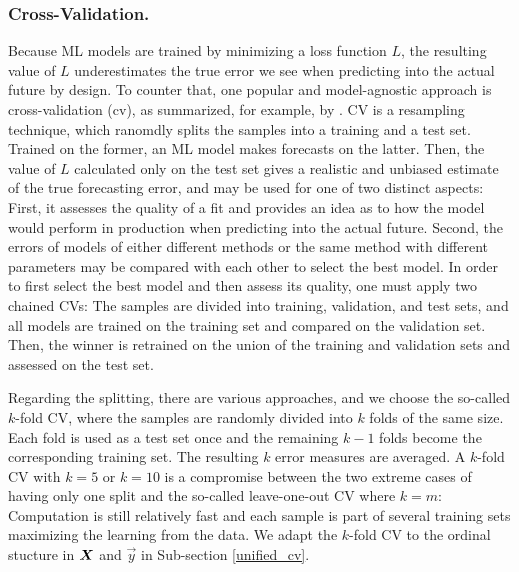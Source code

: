 \subsubsection{Cross-Validation.}
\label{cv}

Because ML models are trained by minimizing a loss function $L$, the
    resulting value of $L$ underestimates the true error we see when
    predicting into the actual future by design.
To counter that, one popular and model-agnostic approach is cross-validation
    (\gls{cv}), as summarized, for example, by \cite{hastie2013}.
CV is a resampling technique, which ranomdly splits the samples into a
    training and a test set.
Trained on the former, an ML model makes forecasts on the latter.
Then, the value of $L$ calculated only on the test set gives a realistic and
    unbiased estimate of the true forecasting error, and may be used for one
    of two distinct aspects:
First, it assesses the quality of a fit and provides an idea as to how the
    model would perform in production when predicting into the actual future.
Second, the errors of models of either different methods or the same method
    with different parameters may be compared with each other to select the
    best model.
In order to first select the best model and then assess its quality, one must
    apply two chained CVs:
The samples are divided into training, validation, and test sets, and all
    models are trained on the training set and compared on the validation set.
Then, the winner is retrained on the union of the training and validation
    sets and assessed on the test set.

Regarding the splitting, there are various approaches, and we choose the
    so-called $k$-fold CV, where the samples are randomly divided into $k$
    folds of the same size.
Each fold is used as a test set once and the remaining $k-1$ folds become
    the corresponding training set.
The resulting $k$ error measures are averaged.
A $k$-fold CV with $k=5$ or $k=10$ is a compromise between the two extreme
    cases of having only one split and the so-called leave-one-out CV
    where $k = m$: Computation is still relatively fast and each sample is
    part of several training sets maximizing the learning from the data.
We adapt the $k$-fold CV to the ordinal stucture in $\bm{X}$ and $\vec{y}$ in
    Sub-section \ref{unified_cv}.
